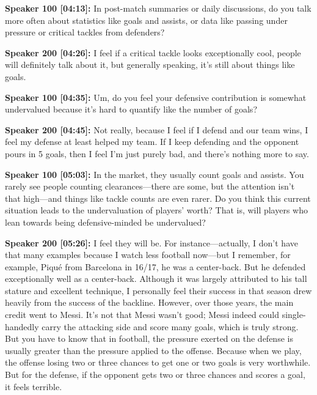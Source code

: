 \documentclass[11pt,a4paper]{article}
\begin{document}
\begin{linenumbers}
\vspace{0.5em}
\noindent \textbf{Speaker 100 [04:13]:} In post-match summaries or daily discussions, do you talk more often about statistics like goals and assists, or data like passing under pressure or critical tackles from defenders? 

\vspace{0.5em}
\noindent \textbf{Speaker 200 [04:26]:} I feel if a critical tackle looks exceptionally cool, people will definitely talk about it, but generally speaking, it's still about things like goals. 

\vspace{0.5em}
\noindent \textbf{Speaker 100 [04:35]:} Um, do you feel your defensive contribution is somewhat undervalued because it's hard to quantify like the number of goals? 

\vspace{0.5em}
\noindent \textbf{Speaker 200 [04:45]:} Not really, because I feel if I defend and our team wins, I feel my defense at least helped my team. If I keep defending and the opponent pours in 5 goals, then I feel I'm just purely bad, and there's nothing more to say. 

\vspace{0.5em}
\noindent \textbf{Speaker 100 [05:03]:} In the market, they usually count goals and assists. You rarely see people counting clearances—there are some, but the attention isn't that high—and things like tackle counts are even rarer. Do you think this current situation leads to the undervaluation of players' worth? That is, will players who lean towards being defensive-minded be undervalued? 

\vspace{0.5em}
\noindent \textbf{Speaker 200 [05:26]:} I feel they will be. For instance—actually, I don't have that many examples because I watch less football now—but I remember, for example, Piqué from Barcelona in 16/17, he was a center-back. But he defended exceptionally well as a center-back. Although it was largely attributed to his tall stature and excellent technique, I personally feel their success in that season drew heavily from the success of the backline. However, over those years, the main credit went to Messi. It's not that Messi wasn't good; Messi indeed could single-handedly carry the attacking side and score many goals, which is truly strong. But you have to know that in football, the pressure exerted on the defense is usually greater than the pressure applied to the offense. Because when we play, the offense losing two or three chances to get one or two goals is very worthwhile. But for the defense, if the opponent gets two or three chances and scores a goal, it feels terrible. 


\end{linenumbers}
\end{document}
